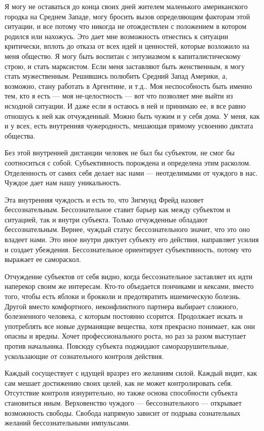 \documentclass[11pt]{book}
\begin{document}
Я могу не оставаться до конца своих дней жителем маленького американского городка на Среднем Западе, могу бросить вызов определяющим факторам этой ситуации, и все потому что никогда не отождествлен с положением в котором родился или нахожусь. Это дает мне возможность отнестись к ситуации критически, вплоть до отказа от всех идей и ценностей, которые возложило на меня общество. Я могу быть воспитан с энтузиазмом к капиталистическому строю, и стать марксистом. Если меня заставляют быть женственным, я могу стать мужественным. Решившись полюбить Средний Запад Америки, а, возможно, стану работать в Аргентине, и т.д.. Моя неспособность быть именно тем, кто я есть --- моя не-целостность --- вот что позволяет мне выйти из исходной ситуации. И даже если я остаюсь в ней и принимаю ее, я все равно отношусь к ней как отчужденный. Можно быть чужим и у себя дома. У меня, как и у всех, есть внутренняя чужеродность, мешающая прямому усвоению диктата общества.

Без этой внутренней дистанции человек не был бы субъектом, не смог бы соотноситься с собой. Субъективность порождена и определена этим расколом. Отделенность от самих себя делает нас нами --- неотделимыми от чуждого в нас. Чуждое дает нам нашу уникальность.

Эта внутренняя чуждость и есть то, что Зигмунд Фрейд назовет бессознательным. Бессознательное ставит барьер как между субъектом и ситуацией, так и внутри субъекта. Только отчужденные обладают бессознательным. Вернее, чуждый статус бессознательного значит, что это оно владеет нами. Это иное внутри диктует субъекту его действия, направляет усилия и создает убеждения. Бессознательное ориентирует субъективность, потому что выражает ее самораскол.

Отчуждение субъектов от себя видно, когда бессознательное заставляет их идти наперекор своим же интересам. Кто-то объедается пончиками и кексами, вместо того, чтобы есть яблоки и брокколи и предотвратить ишемическую болезнь. Другой вместо комфортного, неконфликтного партнера выбирает сложного, болезненного человека, с которым постоянно ссорится. Продолжает искать и употреблять все новые дурманящие вещества, хотя прекрасно понимает, как они опасны и вредны. Хочет профессионального роста, но раз за разом выступает против начальника. Повсюду субъекта поджидают саморазрушительные, ускользающие от сознательного контроля действия.

Каждый сосуществует с идущей вразрез его желаниям силой. Каждый видит, как сам мешает достижению своих целей, как не может контролировать себя. Отсутствие контроля изнурительно, но также основа способности субъекта становиться иным. Верховенство чуждого --- бессознательного --- открывает возможность свободы. Свобода напрямую зависит от подрыва сознательных желаний бессознательными импульсами.
\end{document}
